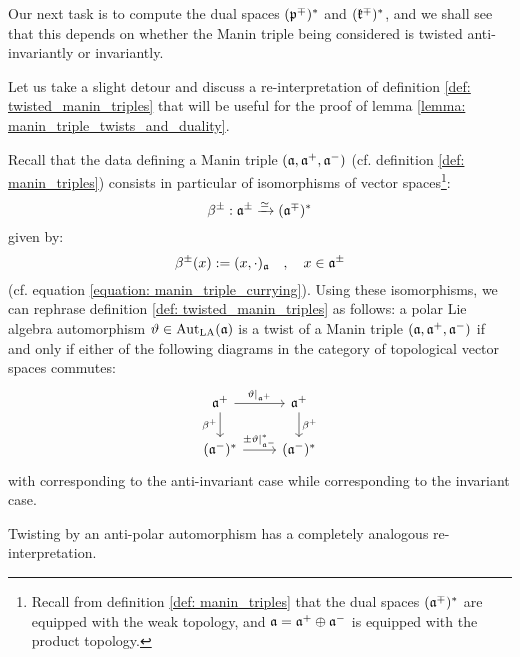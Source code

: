         Our next task is to compute the dual spaces $(\mathfrak{p}^{\mp})^*$ and $(\mathfrak{k}^{\mp})^*$, and we shall see that this depends on whether the Manin triple being considered is twisted anti-invariantly or invariantly.
        \begin{remark} \label{remark: manin_triple_twists_via_currying}
            Let us take a slight detour and discuss a re-interpretation of definition \ref{def: twisted_manin_triples} that will be useful for the proof of lemma \ref{lemma: manin_triple_twists_and_duality}.
        
            Recall that the data defining a Manin triple $(\mathfrak{a}, \mathfrak{a}^+, \mathfrak{a}^-)$ (cf. definition \ref{def: manin_triples}) consists in particular of isomorphisms of vector spaces\footnote{Recall from definition \ref{def: manin_triples} that the dual spaces $(\mathfrak{a}^{\mp})^*$ are equipped with the weak topology, and $\mathfrak{a} = \mathfrak{a}^+ \oplus \mathfrak{a}^-$ is equipped with the product topology.}:
                $$\beta^{\pm}: \mathfrak{a}^{\pm} \xrightarrow[]{\simeq} (\mathfrak{a}^{\mp})^*$$
            given by:
                $$\beta^{\pm}(x) := (x, \cdot)_{\mathfrak{a}} \quad, \quad x \in \mathfrak{a}^{\pm}$$
            (cf. equation \eqref{equation: manin_triple_currying}). Using these isomorphisms, we can rephrase definition \ref{def: twisted_manin_triples} as follows: a polar Lie algebra automorphism $\vartheta \in \operatorname{Aut}_{\mathrm{LA}}(\mathfrak{a})$ is a twist of a Manin triple $(\mathfrak{a}, \mathfrak{a}^+, \mathfrak{a}^-)$ if and only if either of the following diagrams in the category of topological vector spaces commutes:
                \begin{equation} \label{diagram: manin_triple_twist_currying}
                    \begin{tikzcd}
                    	{\a^+} & {\a^+} \\
                    	{(\a^-)^*} & {(\a^-)^*}
                    	\arrow["\vartheta|_{\a^+}", from=1-1, to=1-2]
                    	\arrow["{\beta^+}"', from=1-1, to=2-1]
                    	\arrow["{\beta^+}", from=1-2, to=2-2]
                    	\arrow["{\pm \vartheta|_{\a^-}^*}", from=2-1, to=2-2]
                    \end{tikzcd}
                \end{equation}
            with \say{$-\vartheta^*$} corresponding to the anti-invariant case while \say{$\vartheta^*$} corresponding to the invariant case.

            Twisting by an anti-polar automorphism has a completely analogous re-interpretation.
        \end{remark}
        
